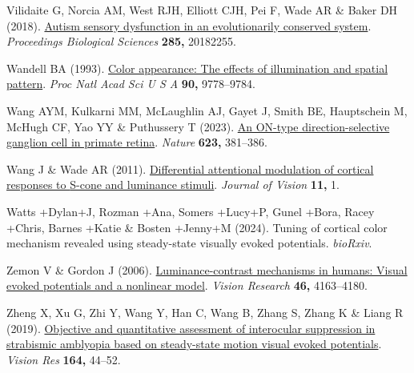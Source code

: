 \documentclass[
  letterpaper,
  DIV=11,
  numbers=noendperiod]{scrartcl}
\newlength{\cslhangindent}
\newenvironment{CSLReferences}[2] %
 {\begin{list}{}{%
  \setlength{\itemindent}{0pt}
  \setlength{\leftmargin}{0pt}
  \setlength{\parsep}{0pt}
  \ifodd #1
   \setlength{\leftmargin}{\cslhangindent}
   \setlength{\itemindent}{-1\cslhangindent}
  \fi
  \setlength{\itemsep}{#2\baselineskip}}}
 {\end{list}}
\begin{document}
\begin{CSLReferences}{1}{1}
Vilidaite G, Norcia AM, West RJH, Elliott CJH, Pei F, Wade AR \& Baker
DH (2018). \href{https://doi.org/10.1098/rspb.2018.2255}{Autism sensory
dysfunction in an evolutionarily conserved system}. \emph{Proceedings
Biological Sciences} \textbf{285,} 20182255.

Wandell BA (1993). \href{https://doi.org/10.1073/pnas.90.21.9778}{Color
appearance: The effects of illumination and spatial pattern}. \emph{Proc
Natl Acad Sci U S A} \textbf{90,} 9778--9784.

Wang AYM, Kulkarni MM, McLaughlin AJ, Gayet J, Smith BE, Hauptschein M,
McHugh CF, Yao YY \& Puthussery T (2023).
\href{https://doi.org/10.1038/s41586-023-06659-4}{An ON-type
direction-selective ganglion cell in primate retina}. \emph{Nature}
\textbf{623,} 381--386.

Wang J \& Wade AR (2011).
\href{https://doi.org/10.1167/11.6.1}{Differential attentional
modulation of cortical responses to {S}-cone and luminance stimuli}.
\emph{Journal of Vision} \textbf{11,} 1.

Watts +Dylan+J, Rozman +Ana, Somers +Lucy+P, Gunel +Bora, Racey +Chris,
Barnes +Katie \& Bosten +Jenny+M (2024). Tuning of cortical color
mechanism revealed using steady-state visually evoked potentials.
\emph{bioRxiv}.

Zemon V \& Gordon J (2006).
\href{https://doi.org/10.1016/j.visres.2006.07.007}{Luminance-contrast
mechanisms in humans: Visual evoked potentials and a nonlinear model}.
\emph{Vision Research} \textbf{46,} 4163--4180.

Zheng X, Xu G, Zhi Y, Wang Y, Han C, Wang B, Zhang S, Zhang K \& Liang R
(2019). \href{https://doi.org/10.1016/j.visres.2019.07.003}{Objective
and quantitative assessment of interocular suppression in strabismic
amblyopia based on steady-state motion visual evoked potentials}.
\emph{Vision Res} \textbf{164,} 44--52.

\end{CSLReferences}
\end{document}
